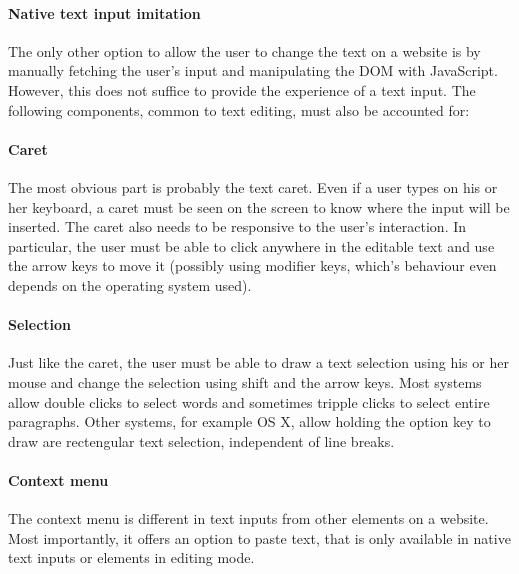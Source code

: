 \paragraph{Native text input imitation} The only other option to allow the user to change the text on a website is by manually fetching the user's input and manipulating the DOM with JavaScript. However, this does not suffice to provide the experience of a text input. The following components, common to text editing, must also be accounted for:



\paragraph{Caret} The most obvious part is probably the text caret. Even if a user types on his or her keyboard, a caret must be seen on the screen to know where the input will be inserted. The caret also needs to be responsive to the user's interaction. In particular, the user must be able to click anywhere in the editable text and use the arrow keys to move it (possibly using modifier keys, which's behaviour even depends on the operating system used).

\paragraph{Selection} Just like the caret, the user must be able to draw a text selection using his or her mouse and change the selection using shift and the arrow keys. Most systems allow double clicks to select words and sometimes tripple clicks to select entire paragraphs. Other systems, for example OS X, allow holding the option key to draw are rectengular text selection, independent of line breaks.

\paragraph{Context menu} The context menu is different in text inputs from other elements on a website. Most importantly, it offers an option to paste text, that is only available in native text inputs or elements in editing mode.


